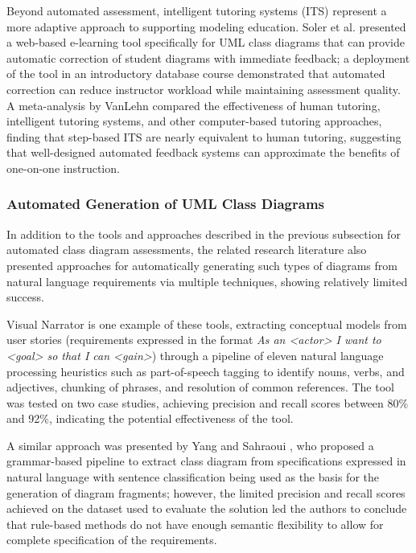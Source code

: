 Beyond automated assessment, intelligent tutoring systems (ITS) represent a more adaptive approach to supporting modeling education. Soler et al. \cite{soler2010web} presented a web-based e-learning tool specifically for UML class diagrams that can provide automatic correction of student diagrams with immediate feedback; a deployment of the tool in an introductory database course demonstrated that automated correction can reduce instructor workload while maintaining assessment quality. A meta-analysis by VanLehn \cite{vanlehn2011relative} compared the effectiveness of human tutoring, intelligent tutoring systems, and other computer-based tutoring approaches, finding that step-based ITS are nearly equivalent to human tutoring, suggesting that well-designed automated feedback systems can approximate the benefits of one-on-one instruction. 


\subsubsection{Automated Generation of UML Class Diagrams}

In addition to the tools and approaches described in the previous subsection for automated class diagram assessments, the related research literature also presented approaches for automatically generating such types of diagrams from natural language requirements via multiple techniques, showing relatively limited success. 

Visual Narrator \cite{robeer2016automated} is one example of these tools, extracting conceptual models from user stories (requirements expressed in the format \textit{As an <actor> I want to <goal> so that I can <gain>}) through a pipeline of eleven natural language processing heuristics such as part-of-speech tagging to identify nouns, verbs, and adjectives, chunking of phrases, and resolution of common references. The tool was tested on two case studies, achieving precision and recall scores between 80\% and 92\%, indicating the potential effectiveness of the tool.

A similar approach was presented by Yang and Sahraoui \cite{yang2022towards}, who proposed a grammar-based pipeline to extract class diagram from specifications expressed in natural language with sentence classification being used as the basis for the generation of diagram fragments; however, the limited precision and recall scores achieved on the dataset used to evaluate the solution led the authors to conclude that rule-based methods do not have enough semantic flexibility to allow for complete specification of the requirements.

